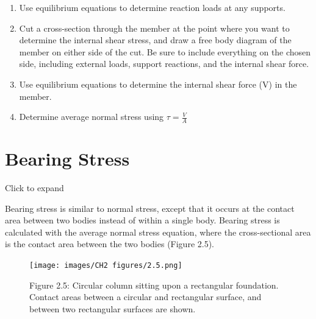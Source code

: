 \documentclass[
  letterpaper,
  DIV=11,
  numbers=noendperiod]{scrreprt}
\theoremstyle{definition}
\theoremstyle{remark}
\begin{document}
\begin{tcolorbox}[enhanced jigsaw, leftrule=.75mm, colbacktitle=quarto-callout-warning-color!10!white, breakable, opacityback=0, colback=white, titlerule=0mm, toprule=.15mm, colframe=quarto-callout-warning-color-frame, coltitle=black, title={Step-by-step: Average Shear stress}, toptitle=1mm, bottomrule=.15mm, rightrule=.15mm, left=2mm, arc=.35mm, opacitybacktitle=0.6, bottomtitle=1mm]

\begin{enumerate}
\def\labelenumi{\arabic{enumi}.}
\item
  Use equilibrium equations to determine reaction loads at any supports.
\item
  Cut a cross-section through the member at the point where you want to
  determine the internal shear stress, and draw a free body diagram of
  the member on either side of the cut. Be sure to include everything on
  the chosen side, including external loads, support reactions, and the
  internal shear force.
\item
  Use equilibrium equations to determine the internal shear force (V) in
  the member.
\item
  Determine average normal stress using \(\tau=\frac{V}{A}\)
\end{enumerate}

\end{tcolorbox}

\section{Bearing Stress}\label{sec-2.3}

Click to expand

Bearing stress is similar to normal stress, except that it occurs at the
contact area between two bodies instead of within a single body. Bearing
stress is calculated with the average normal stress equation, where the
cross-sectional area is the contact area between the two bodies (Figure
2.5).

\begin{figure}[H]

{\centering \texttt{[image: images/CH2 figures/2.5.png]}

}

\caption{Figure 2.5: Circular column sitting upon a rectangular
foundation. Contact areas between a circular and rectangular surface,
and between two rectangular surfaces are shown.}

\end{figure}%
\end{document}
